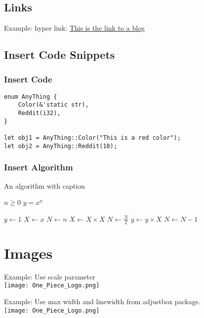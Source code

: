 \documentclass[letterpaper, oneside]{book}
\begin{document}
	
	\section{Links}
	
	Example: hyper link:  \href{https://news.ycombinator.com/news}{This is the link to a blog}
	
\section{Insert Code Snippets}
	
\subsection{Insert Code}

\begin{lstlisting}
enum AnyThing {
	Color(&'static str),
	Reddit(i32),
}

let obj1 = AnyThing::Color("This is a red color");
let obj2 = AnyThing::Reddit(10);
\end{lstlisting}

\subsection{Insert Algorithm}

\begin{algorithm}
	\caption{An algorithm with caption}\label{alg:cap}

	\begin{algorithmic}[1]
		\Require $n \geq 0$
		\Ensure $y = x^n$
	
		\State $y \gets 1$
		\State $X \gets x$
		\State $N \gets n$
		\State $X \gets X \times X$
		\State $N \gets \frac{N}{2}$  
		\State $y \gets y \times X$
		\State $N \gets N - 1$
		\EndIf
		\EndWhile

	
	\end{algorithmic}
\end{algorithm}

	
	
	\chapter{Images}
	Example: Use scale parameter \\
	\texttt{[image: One\_Piece\_Logo.png]}  

	Example: Use max width and linewidth from adjustbox package. \\
	\texttt{[image: One\_Piece\_Logo.png]}  
	
\end{document}
